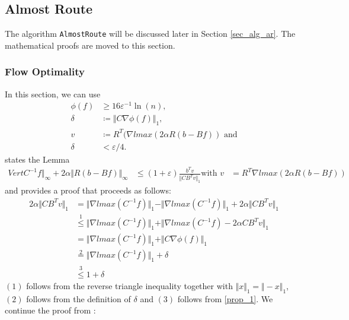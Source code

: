 \subsection{Almost Route}
The algorithm \texttt{AlmostRoute} will be discussed later in Section \ref{sec_alg_ar}. The mathematical proofs are moved to this section.
\subsubsection{Flow Optimality}
\label{sec_math_fo}
In this section, we can use 
\begin{align*}
\phi(f)&\geq 16\varepsilon^{-1}\ln(n),\\
\delta &\coloneqq \Vert C\nabla\phi(f)\Vert_1,\\
v&\coloneqq R^T(\nabla lmax(2\alpha R(b-Bf))\text{ and}\\
\delta &<\varepsilon/4.
\end{align*}
\cite{nmfnlt} states the Lemma 
\begin{align*}
Vert C^{-1}f\Vert_\infty+2\alpha\Vert R(b-Bf)\Vert_\infty&\leq (1+\varepsilon)\frac{b^Tv}{\Vert CB^Tv\Vert_1}
\text{with }v&=R^T\nabla lmax(2\alpha R(b-Bf))
\end{align*} and provides a proof that proceeds as follows:
\begin{align*}
2\alpha\Vert CB^Tv\Vert_1&=\Vert \nabla lmax(C^{-1}f)\Vert_1-\Vert \nabla lmax(C^{-1}f)\Vert_1+2\alpha\Vert CB^Tv\Vert_1\\
&\stackrel{1}{\leq} \Vert \nabla lmax(C^{-1}f)\Vert_1+\Vert\nabla lmax(C^{-1}f) - 2\alpha CB^Tv\Vert_1\\
&=\Vert \nabla lmax(C^{-1}f)\Vert_1+\Vert C\nabla \phi(f)\Vert_1\\
&\stackrel{2}{=}\Vert \nabla lmax(C^{-1}f)\Vert_1+\delta\\
&\stackrel{3}{\leq} 1+\delta
\end{align*}
$(1)$ follows from the reverse triangle inequality together with $\Vert x\Vert_1=\Vert -x\Vert_1$, $(2)$ follows from the definition of $\delta$ and $(3)$ follows from \ref{prop_1}. We continue the proof from \cite{nmfnlt}:
